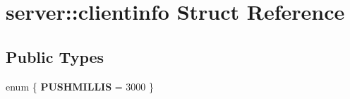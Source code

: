 \hypertarget{structserver_1_1clientinfo}{}\section{server\+:\+:clientinfo Struct Reference}
\label{structserver_1_1clientinfo}
\subsection*{Public Types}
\begin{DoxyCompactItemize}
\item 
\mbox{\label{structserver_1_1clientinfo_ad6da0c29adb5ee59f89caf401b430790}} 
enum \{ {\bfseries P\+U\+S\+H\+M\+I\+L\+L\+IS} = 3000
 \}
\end{DoxyCompactItemize}
